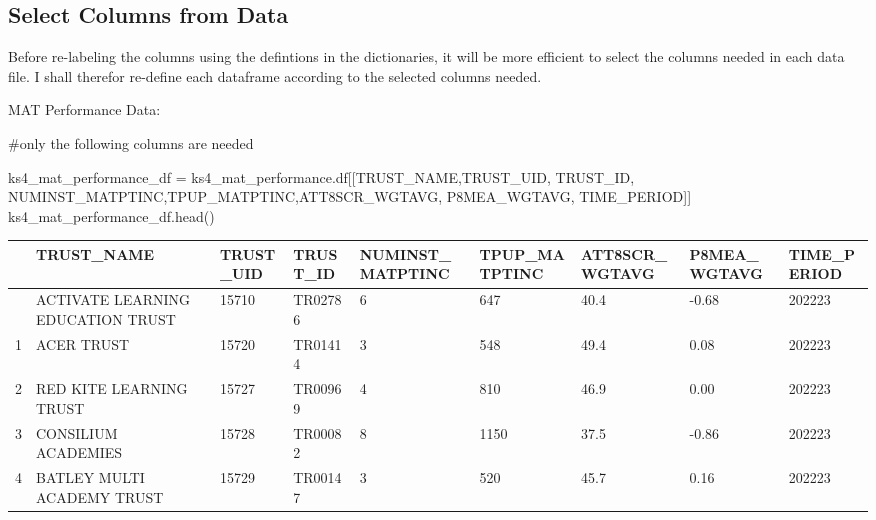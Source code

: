 \documentclass[
  letterpaper,
  DIV=11,
  numbers=noendperiod]{scrartcl}
\newenvironment{Shaded}{\begin{snugshade}}{\end{snugshade}}
\newcommand{\CommentTok}[1]{\textcolor[rgb]{0.37,0.37,0.37}{#1}}
\newcommand{\NormalTok}[1]{\textcolor[rgb]{0.00,0.23,0.31}{#1}}
\newcommand{\OperatorTok}[1]{\textcolor[rgb]{0.37,0.37,0.37}{#1}}
\newcommand{\StringTok}[1]{\textcolor[rgb]{0.13,0.47,0.30}{#1}}
\begin{document}
\subsection{Select Columns from Data}\label{select-columns-from-data}

Before re-labeling the columns using the defintions in the dictionaries,
it will be more efficient to select the columns needed in each data
file. I shall therefor re-define each dataframe according to the
selected columns needed.

MAT Performance Data:

\begin{Shaded}
\begin{Highlighting}[]
\CommentTok{\#only the following columns are needed}

\NormalTok{ks4\_mat\_performance\_df }\OperatorTok{=}\NormalTok{ ks4\_mat\_performance.df[[}\StringTok{\textquotesingle{}TRUST\_NAME\textquotesingle{}}\NormalTok{,}\StringTok{\textquotesingle{}TRUST\_UID\textquotesingle{}}\NormalTok{, }\StringTok{\textquotesingle{}TRUST\_ID\textquotesingle{}}\NormalTok{, }\StringTok{\textquotesingle{}NUMINST\_MATPTINC\textquotesingle{}}\NormalTok{,}\StringTok{\textquotesingle{}TPUP\_MATPTINC\textquotesingle{}}\NormalTok{,}\StringTok{\textquotesingle{}ATT8SCR\_WGTAVG\textquotesingle{}}\NormalTok{, }\StringTok{\textquotesingle{}P8MEA\_WGTAVG\textquotesingle{}}\NormalTok{, }\StringTok{\textquotesingle{}TIME\_PERIOD\textquotesingle{}}\NormalTok{]]}
\NormalTok{ks4\_mat\_performance\_df.head()}
\end{Highlighting}
\end{Shaded}

\begin{longtable}[]{@{}lllllllll@{}}
\toprule\noalign{}
& TRUST\_NAME & TRUST\_UID & TRUST\_ID & NUMINST\_MATPTINC &
TPUP\_MATPTINC & ATT8SCR\_WGTAVG & P8MEA\_WGTAVG & TIME\_PERIOD \\
\midrule\noalign{}
\endhead
\bottomrule\noalign{}
\endlastfoot
0 & ACTIVATE LEARNING EDUCATION TRUST & 15710 & TR02786 & 6 & 647 & 40.4
& -0.68 & 202223 \\
1 & ACER TRUST & 15720 & TR01414 & 3 & 548 & 49.4 & 0.08 & 202223 \\
2 & RED KITE LEARNING TRUST & 15727 & TR00969 & 4 & 810 & 46.9 & 0.00 &
202223 \\
3 & CONSILIUM ACADEMIES & 15728 & TR00082 & 8 & 1150 & 37.5 & -0.86 &
202223 \\
4 & BATLEY MULTI ACADEMY TRUST & 15729 & TR00147 & 3 & 520 & 45.7 & 0.16
& 202223 \\
\end{longtable}
\end{document}
